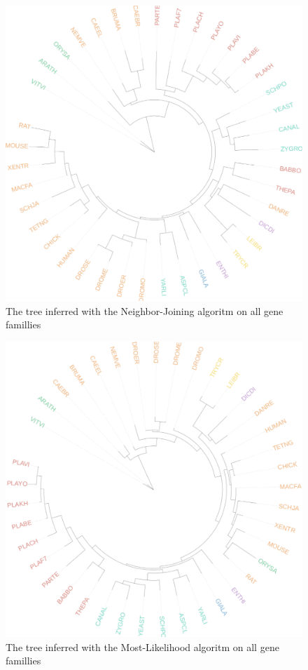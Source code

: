 \documentclass[]{article}
\theoremstyle{definition}
\begin{document}
\begin{figure}[H]
	\includegraphics*[width = \linewidth]{image/Nj_ex3.pdf}
	\caption{ The tree inferred with the Neighbor-Joining algoritm on all gene famillies }
\end{figure}

\begin{figure}[H]
	\includegraphics*[width = \linewidth]{image/Ml_ex3.pdf}
	\caption{ The tree inferred with the Most-Likelihood algoritm on all gene famillies}
\end{figure}
\end{document}
